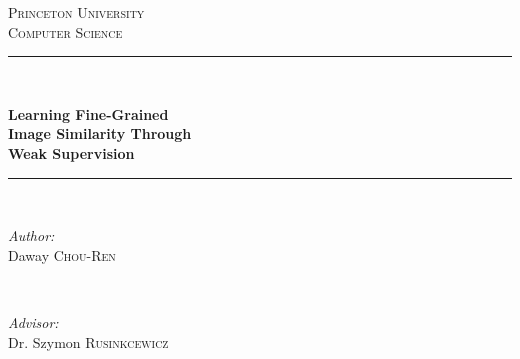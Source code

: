 \documentclass[11pt, notitlepage]{report}
\begin{document}
\hypersetup{pageanchor=false}
\begin{titlepage}

\newcommand{\HRule}{\rule{.8\linewidth}{0.5mm}} %
\renewenvironment{abstract}
 {\small
  \begin{center}
  \bfseries \abstractname\vspace{-.5em}\vspace{0pt}
  \end{center}
  \list{}{
    \setlength{\leftmargin}{.5cm}%
    \setlength{\rightmargin}{\leftmargin}%
  }%
  \item\relax}
 {\endlist}


\center %


\textsc{\LARGE Princeton University}\\[0.5cm] %
\textsc{\large Computer Science}\\[0.5cm] %

\vspace{2em}

\HRule \\[0.2cm]
{\Large \bfseries Learning Fine-Grained\\
	Image Similarity Through\\
	Weak Supervision\\
\par}
\HRule \\[1.5cm]
 
\vspace{2em}

\begin{minipage}{0.4\textwidth}
\begin{flushleft} \large
\emph{Author:}\\
Daway \textsc{Chou-Ren} %
\end{flushleft}
\end{minipage}
~
\begin{minipage}{0.4\textwidth}
\begin{flushright} \large
\emph{Advisor:} \\
Dr. Szymon \textsc{Rusinkcewicz} %
\end{flushright}
\end{minipage}\\[1cm]


\end{titlepage}
\end{document}
